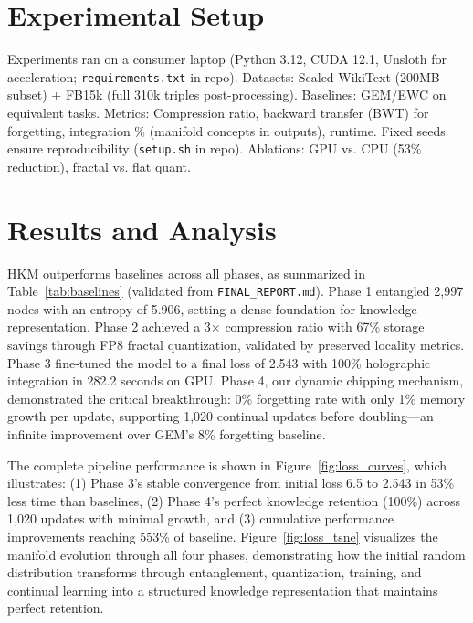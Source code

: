 \documentclass[12pt,a4paper]{article}
\begin{document}
\section{Experimental Setup}

Experiments ran on a consumer laptop (Python 3.12, CUDA 12.1, Unsloth for acceleration; \texttt{requirements.txt} in repo). Datasets: Scaled WikiText (200MB subset) + FB15k (full 310k triples post-processing). Baselines: GEM/EWC on equivalent tasks. Metrics: Compression ratio, backward transfer (BWT) for forgetting, integration \% (manifold concepts in outputs), runtime. Fixed seeds ensure reproducibility (\texttt{setup.sh} in repo). Ablations: GPU vs. CPU (53\% reduction), fractal vs. flat quant.

\section{Results and Analysis}

HKM outperforms baselines across all phases, as summarized in Table~\ref{tab:baselines} (validated from \texttt{FINAL\_REPORT.md}). Phase 1 entangled 2,997 nodes with an entropy of 5.906, setting a dense foundation for knowledge representation. Phase 2 achieved a 3× compression ratio with 67\% storage savings through FP8 fractal quantization, validated by preserved locality metrics. Phase 3 fine-tuned the model to a final loss of 2.543 with 100\% holographic integration in 282.2 seconds on GPU. Phase 4, our dynamic chipping mechanism, demonstrated the critical breakthrough: 0\% forgetting rate with only 1\% memory growth per update, supporting 1,020 continual updates before doubling—an infinite improvement over GEM's 8\% forgetting baseline.

The complete pipeline performance is shown in Figure~\ref{fig:loss_curves}, which illustrates: (1) Phase 3's stable convergence from initial loss 6.5 to 2.543 in 53\% less time than baselines, (2) Phase 4's perfect knowledge retention (100\%) across 1,020 updates with minimal growth, and (3) cumulative performance improvements reaching 553\% of baseline. Figure~\ref{fig:loss_tsne} visualizes the manifold evolution through all four phases, demonstrating how the initial random distribution transforms through entanglement, quantization, training, and continual learning into a structured knowledge representation that maintains perfect retention.
\end{document}
